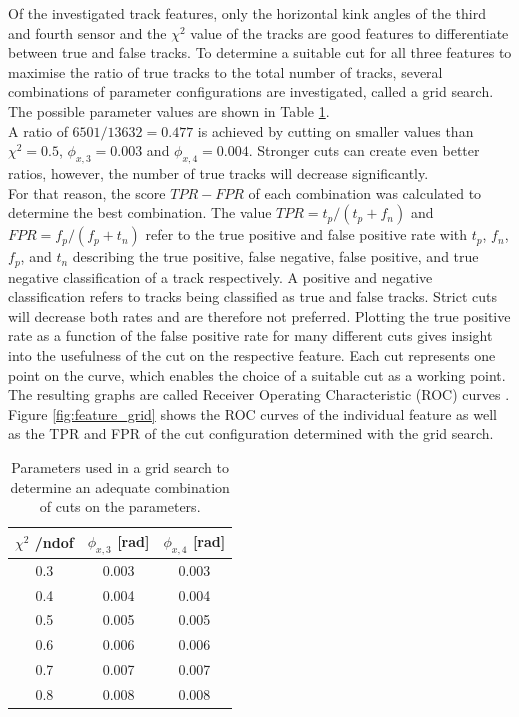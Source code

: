 Of the investigated track features, only the horizontal kink angles of the third and fourth sensor and the $\chi^2$ value of the tracks are good
features to differentiate between true and false tracks. To determine a suitable
cut for all three features to maximise the ratio of true tracks to the total number of tracks, several combinations of parameter configurations are investigated, called a
grid search.
The possible parameter values are shown in Table \ref{tab:params}. \\
A ratio of $6501/13632 = 0.477$ is achieved by cutting on smaller values
than $\chi^2 = 0.5$, $\phi_{x,3} = 0.003$ and $\phi_{x,4}=0.004$.
Stronger cuts can create even better ratios, however, the number of true tracks will decrease significantly. \\
For that reason, the score $TPR-FPR$ of each combination
was calculated to determine the best combination. The value $TPR = t_p/(t_p + f_n)$ and $FPR = f_p/(f_p + t_n)$
refer to the true positive and false positive rate with
$t_p$, $f_n$, $f_p$, and $t_n$ describing the true positive, false negative, false positive, and true negative classification of a track respectively.
A positive and negative classification refers to tracks being classified as true and false tracks.
Strict cuts will decrease both rates and are therefore not preferred. Plotting the
true positive rate as a function of the false positive rate for many different cuts gives insight into the usefulness of the cut on the respective feature. Each cut
represents one point on the curve, which enables the choice of a suitable cut as a working point.
The resulting
graphs are called Receiver Operating Characteristic (ROC) curves \cite{roc}.
Figure \ref{fig:feature_grid} shows the ROC curves of the individual feature as well as the TPR and FPR of the cut configuration determined with the grid search.

\begin{table}
  \centering
  \caption{Parameters used in a grid search to determine an adequate combination of cuts on the parameters.}
  \begin{tabular}{c c c}
    \toprule
    $\chi^2$ /ndof & $\phi_{x,3}$ [rad] & $\phi_{x,4}$ [rad]\\
    \midrule
    0.3 & 0.003 & 0.003 \\
    0.4 & 0.004 & 0.004 \\
    0.5 & 0.005 & 0.005 \\
    0.6 & 0.006 & 0.006 \\
    0.7 & 0.007 & 0.007 \\
    0.8 & 0.008 & 0.008
  \end{tabular}
  \label{tab:params}
\end{table}



